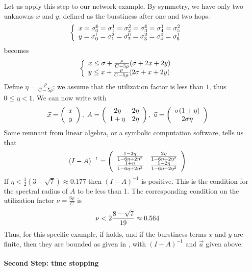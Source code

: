 Let us apply this step to our network example. By symmetry, we
have only two unknowns $x$ and $y$, defined as the burstiness
after one and two hops:
$$\left\{\begin{array}{l} 
x=\sigma_0^0=\sigma_1^1=\sigma_2^2=\sigma_3^0=\sigma_4^1=\sigma_5^2\\
y=\sigma_0^1=\sigma_1^2=\sigma_2^0=\sigma_3^2=\sigma_4^0=\sigma_5^1
  \end{array} \right.
$$
 becomes
$$
\left\{\begin{array}{l} 
 x \leq \sigma + \frac{\rho}{C -5 \rho} ( \sigma + 2x + 2y)\\
 y \leq x + \frac{\rho}{C -5 \rho} ( 2 \sigma +  x + 2y)
   \end{array} \right.
$$
Define $\eta=\frac{\rho}{C-5 \rho}$; we assume that the
utilization factor is less than $1$, thus $0 \leq \eta <1$. We can
now write  with
$$
 \vec{x}=\left(
  \begin{array}{c}
    x\\y
  \end{array}\right)
  ,\;
 A= \left(\begin{array}{c c}
    2 \eta &  2 \eta\\1 + \eta & 2 \eta
  \end{array}\right)
  ,\;
   \vec{a}=\left(
  \begin{array}{c}
    \sigma (1 + \eta)\\ 2 \sigma \eta
  \end{array}\right)
$$
Some remnant from linear algebra, or a symbolic computation
software, tells us that
$$
(I-A)^{-1}=\left(\begin{array}{c c}
    \frac{1-2  \eta}{1-6  \eta+2
{\eta^2}} & \frac{2  \eta}{1-6  \eta+2  {\eta^2}}  \\
   \frac{1+\eta}{1-6  \eta+2
{\eta^2}}& \frac{1-2  \eta}{1-6  \eta+2  {\eta^2}}
  \end{array}\right)
$$
If $\eta < \frac{1}{2} (3 -\sqrt{7}) \approx 0.177$ then
$(I-A)^{-1}$ is positive. This is the condition for the spectral
radius of $A$ to be less than 1. The corresponding condition on
the utilization factor $\nu= \frac{6\rho}{C}$ is
\begin{equation}\mylabel{eq-example-ds-1}
 \nu <2 \frac{8-\sqrt{7}}{19} \approx 0.564
\end{equation}
Thus, for this specific example, if  holds,
and if the burstiness terms $x$ and $y$ are finite, then they are
bounded as given in , with $(I-A)^{-1}$ and
$\vec{a}$ given above.

\paragraph{Second Step: time stopping}

